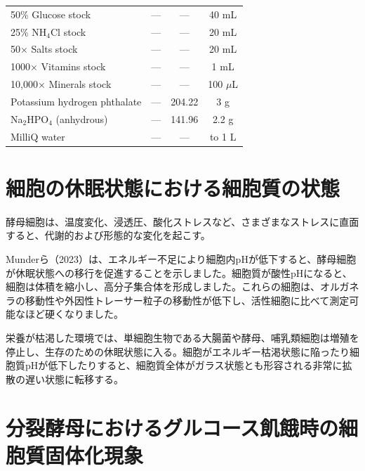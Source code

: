 \begin{table}[H]
\begin{tabular}{lccc}
50\% Glucose stock & --- & --- & 40 mL \\
25\% NH$_4$Cl stock & --- & --- & 20 mL \\
50× Salts stock & --- & --- & 20 mL \\
1000× Vitamins stock & --- & --- & 1 mL \\
10,000× Minerals stock & --- & --- & 100 $\mu$L \\
Potassium hydrogen phthalate & --- & 204.22 & 3 g \\
Na$_2$HPO$_4$ (anhydrous) & --- & 141.96 & 2.2 g \\
MilliQ water & --- & --- & to 1 L \\
\hline
\end{tabular}
\end{table}
\section{細胞の休眠状態における細胞質の状態}

酵母細胞は、温度変化、浸透圧、酸化ストレスなど、さまざまなストレスに直面すると、代謝的および形態的な変化を起こす。

Munderら（2023）は、エネルギー不足により細胞内pHが低下すると、酵母細胞が休眠状態への移行を促進することを示しました。細胞質が酸性pHになると、細胞は体積を縮小し、高分子集合体を形成しました。これらの細胞は、オルガネラの移動性や外因性トレーサー粒子の移動性が低下し、活性細胞に比べて測定可能なほど硬くなりました。

栄養が枯渇した環境では、単細胞生物である大腸菌や酵母、哺乳類細胞は増殖を停止し、生存のための休眠状態に入る。細胞がエネルギー枯渇状態に陥ったり細胞質pHが低下したりすると、細胞質全体がガラス状態とも形容される非常に拡散の遅い状態に転移する。


\section{分裂酵母におけるグルコース飢餓時の細胞質固体化現象}

